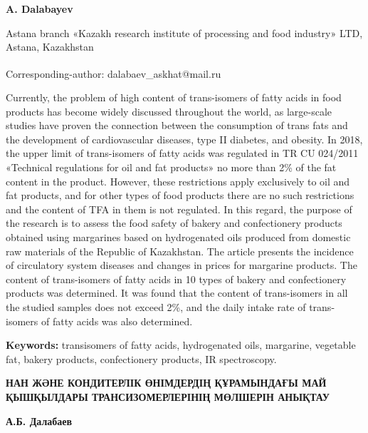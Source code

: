 
\begin{articleheader}

{\bfseries A. Dalabayev}
\end{articleheader}

\begin{affiliation}
Astana branch «Kazakh research institute of processing and food
industry» LTD, Astana, Kazakhstan

\raggedright \textsuperscript{\envelope }Corresponding-author: dalabaev\_askhat@mail.ru
\end{affiliation}

Currently, the problem of high content of trans-isomers of fatty acids
in food products has become widely discussed throughout the world, as
large-scale studies have proven the connection between the consumption
of trans fats and the development of cardiovascular diseases, type II
diabetes, and obesity. In 2018, the upper limit of trans-isomers of
fatty acids was regulated in TR CU 024/2011 «Technical regulations for
oil and fat products» no more than 2\% of the fat content in the
product. However, these restrictions apply exclusively to oil and fat
products, and for other types of food products there are no such
restrictions and the content of TFA in them is not regulated. In this
regard, the purpose of the research is to assess the food safety of
bakery and confectionery products obtained using margarines based on
hydrogenated oils produced from domestic raw materials of the Republic
of Kazakhstan. The article presents the incidence of circulatory system
diseases and changes in prices for margarine products. The content of
trans-isomers of fatty acids in 10 types of bakery and confectionery
products was determined. It was found that the content of trans-isomers
in all the studied samples does not exceed 2\%, and the daily intake
rate of trans-isomers of fatty acids was also determined.

{\bfseries Keywords:} transisomers of fatty acids, hydrogenated oils,
margarine, vegetable fat, bakery products, confectionery products, IR
spectroscopy.

\begin{articleheader}
{\bfseries НАН ЖӘНЕ КОНДИТЕРЛІК ӨНІМДЕРДІҢ ҚҰРАМЫНДАҒЫ МАЙ ҚЫШҚЫЛДАРЫ ТРАНСИЗОМЕРЛЕРІНІҢ МӨЛШЕРІН АНЫҚТАУ}

{\bfseries А.Б. Далабаев}
\end{articleheader}

